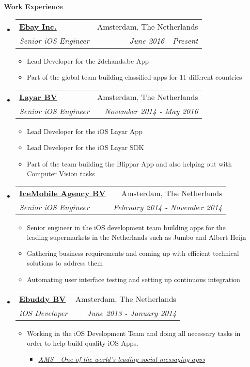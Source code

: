 \documentclass[letterpaper,11pt]{article}
\makeatletter
\newcommand{\resitem}[1]{\item #1 \vspace{-2pt}}
\newcommand{\resheading}[1]{{\large \colorbox{mygrey}{\begin{minipage}{\textwidth}{\textbf{#1 \vphantom{p\^{E}}}}\end{minipage}}}}
\newcommand{\ressubheading}[4]{
\begin{tabular*}{7.0in}{l@{\extracolsep{\fill}}r}
    \textbf{#1} & #2 \\
    \textit{#3} & \textit{#4} \\
\end{tabular*}\vspace{-6pt}}
\makeatother
\begin{document}
\resheading{Work Experience}
\begin{itemize}

\item
    \ressubheading{\href{https://www.ebay.com/}{Ebay Inc.}}{Amsterdam, The Netherlands}{Senior iOS Engineer}{June 2016 - Present}
    \begin{itemize}
        \resitem{Lead Developer for the 2dehands.be App}
        \resitem{Part of the global team building classified apps for 11 different countries}
    \end{itemize}

\item
    \ressubheading{\href{https://www.layar.com/}{Layar BV}}{Amsterdam, The Netherlands}{Senior iOS Engineer}{November 2014 - May 2016}
    \begin{itemize}
        \resitem{Lead Developer for the iOS Layar App}
        \resitem{Lead Developer for the iOS Layar SDK}
        \resitem{Part of the team building the Blippar App and also helping out with Computer Vision tasks}
    \end{itemize}

\item
    \ressubheading{\href{http://www.icemobile.com}{IceMobile Agency BV}}{Amsterdam, The Netherlands}{Senior iOS Engineer}{February 2014 - November 2014}
    \begin{itemize}
        \resitem{Senior engineer in the iOS development team building apps for the leading supermarkets in the Netherlands such as Jumbo and Albert Heijn}
        \resitem{Gathering business requirements and coming up with efficient technical solutions to address them}
        \resitem{Automating user interface testing and setting up continuous integration}
    \end{itemize}

\item
    \ressubheading{\href{http://www.ebuddy.com}{Ebuddy BV}}{Amsterdam, The Netherlands}{iOS Developer}{June 2013 - January 2014}
    \begin{itemize}
        \resitem{Working in the iOS Development Team and doing all necessary tasks in order to help build quality iOS Apps.}
  \begin{itemize}
             \resitem{\href{https://itunes.apple.com/ca/app/xms-unlimited-messaging.-better./id425154540?mt=8}{\emph{XMS - One of the world's leading social messaging apps}}}
        \end{itemize}
    \end{itemize}


\end{itemize}
\end{document}
